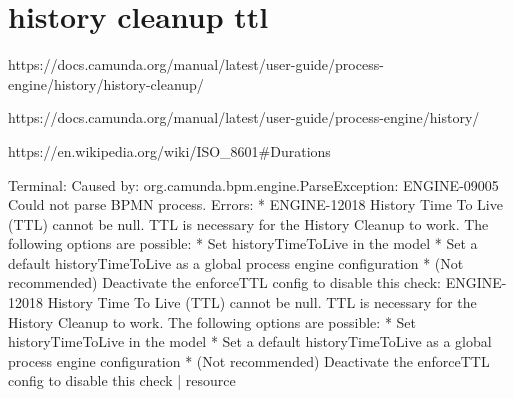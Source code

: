 \section{history cleanup ttl}
https://docs.camunda.org/manual/latest/user-guide/process-engine/history/history-cleanup/

https://docs.camunda.org/manual/latest/user-guide/process-engine/history/

https://en.wikipedia.org/wiki/ISO_8601#Durations


Terminal: 
Caused by: org.camunda.bpm.engine.ParseException: ENGINE-09005 Could not parse BPMN process. Errors: 
* ENGINE-12018 History Time To Live (TTL) cannot be null. TTL is necessary for the History Cleanup to work. The following options are possible:
* Set historyTimeToLive in the model
* Set a default historyTimeToLive as a global process engine configuration
* (Not recommended) Deactivate the enforceTTL config to disable this check: ENGINE-12018 History Time To Live (TTL) cannot be null. TTL is necessary for the History Cleanup to work. The following options are possible:
* Set historyTimeToLive in the model
* Set a default historyTimeToLive as a global process engine configuration
* (Not recommended) Deactivate the enforceTTL config to disable this check | resource 


 
